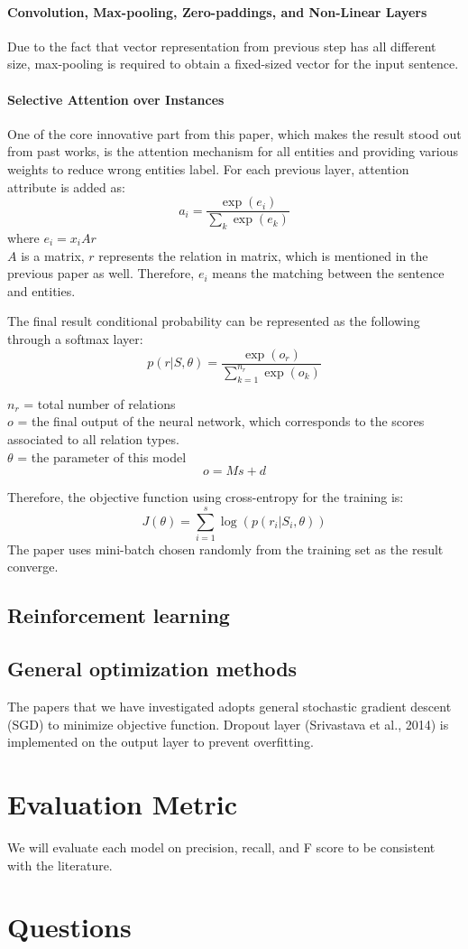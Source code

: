\documentclass{article}
\begin{document}
	\paragraph{Convolution, Max-pooling, Zero-paddings, and Non-Linear Layers}
	Due to the fact that vector representation from previous step has all different size, max-pooling is required to obtain a fixed-sized vector for the input sentence.
	
	\paragraph{Selective Attention over Instances}
	One of the core innovative part from this paper, which makes the result stood out from past works, is the attention mechanism for all entities and providing various weights to reduce wrong entities label. For each previous layer, attention attribute is added as:
	\[a_i = \frac{\exp(e_i)}{\displaystyle\sum_{k} \exp(e_k)}\]
	where \(e_i = x_i A r\) \\
	\(A\) is a matrix, \(r\) represents the relation in matrix, which is mentioned in the previous paper as well. Therefore, \(e_i\) means the matching between the sentence and entities.
	
	The final result conditional probability can be represented as the following through a softmax layer:
	\[p(r|S, \theta) = \frac{\exp(o_r)}{\displaystyle\sum_{k=1}^{n_r} \exp(o_k)}\]

	\(n_r\) = total number of relations \\
	\(o\) = the final output of the neural network, which corresponds to the scores associated to all relation types. \\
	\(\theta\) = the parameter of this model \\
	\[o = Ms + d\]	

	Therefore, the objective function using cross-entropy for the training is:
	\[J(\theta) = \displaystyle\sum_{i=1}^{s} \log(p(r_i|S_i, \theta)) \]
	The paper uses mini-batch chosen randomly from the training set as the result converge.
	
\subsection{Reinforcement learning}


\subsection{General optimization methods}
	The papers that we have investigated adopts general stochastic gradient descent (SGD) to minimize objective function.
	Dropout layer (Srivastava et al., 2014) is implemented on the output layer to prevent overfitting.

\section{Evaluation Metric}
	We will evaluate each model on precision, recall, and F score to be consistent with the literature.
 
 
\section{Questions}



\medskip




\small
\end{document}
